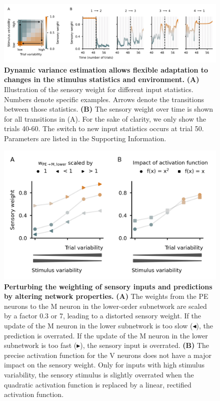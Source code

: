 \documentclass[10pt,a4paper]{article}
\begin{document}
\begin{figure}[!h]
	\centering
    \includegraphics{../results/figures/final/Fig_3_S1}%
\caption{\footnotesize{\bf Dynamic variance estimation allows flexible adaptation to changes in the stimulus statistics and environment. \newline}  
{\bf (A)} Illustration of the sensory weight for different input statistics. Numbers denote specific examples. Arrows denote the transitions between those statistics.
{\bf (B)} The sensory weight over time is shown for all transitions in (A). For the sake of clarity, we only show the trials 40-60. The switch to new input statistics occurs at trial 50. Parameters are listed in the Supporting Information.
}
\label{fig:Fig_3_S1}
\end{figure}


\begin{figure}[!h]
	\centering
    \includegraphics{../results/figures/final/Fig_3_S2}%
\caption{\footnotesize{\bf Perturbing the weighting of sensory inputs and predictions by altering network properties. \newline}  
{\bf (A)} The weights from the PE neurons to the M neuron in the lower-order subnetwork are scaled by a factor 0.3 or 7, leading to a distorted sensory weight. If the update of the M neuron in the lower subnetwork is too slow ($\blacktriangleleft$), the prediction is overrated. If the update of the M neuron in the lower subnetwork is too fast ($\blacktriangleright$), the sensory input is overrated.
{\bf (B)} The precise activation function for the V neurons does not have a major impact on the sensory weight. Only for inputs with high stimulus variability, the sensory stimulus is slightly overrated when the quadratic activation function is replaced by a linear, rectified activation function.
}
\label{fig:Fig_3_S2}
\end{figure}
\end{document}

